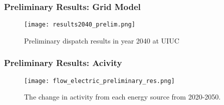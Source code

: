 \begin{frame}
  \frametitle{Preliminary Results: Grid Model}
  \begin{figure}
    \texttt{[image: results2040\_prelim.png]}
    \caption{Preliminary dispatch results in year 2040 at UIUC}
    \label{fig:uiucgrid}
  \end{figure}
\end{frame}

\begin{frame}
  \frametitle{Preliminary Results: Acivity}
  \begin{figure}
    \texttt{[image: flow\_electric\_preliminary\_res.png]}
    \caption{The change in activity from each energy source from 2020-2050.}
    \label{fig:activity}
  \end{figure}
\end{frame}
